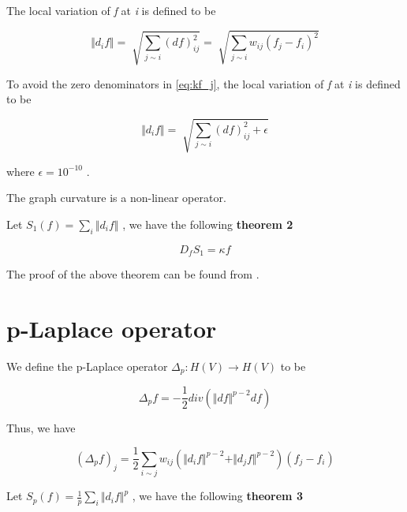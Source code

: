 The local variation of \textit{f} at \textit{i} is defined to be 


\begin{equation}
\Vert d_{i}f \Vert =\sqrt[]{ \sum _{j \sim i}^{} \left( df \right) _{ij}^{2}}=\sqrt[]{ \sum _{j \sim i}^{}w_{ij} \left( f_{j}-f_{i} \right) ^{2}}
\end{equation}


To avoid the zero denominators in \ref{eq:kf_j}, the local variation of \textit{f} at \textit{i} is defined to be


\begin{equation}
\Vert d_{i}f \Vert =\sqrt[]{ \sum _{j \sim i}^{} \left( df \right) _{ij}^{2}+ \epsilon }
\end{equation}


where  \(  \epsilon =10^{-10} \) .

The graph curvature is a non-linear operator.    

Let  \( S_{1} \left( f \right) = \sum _{i}^{} \Vert d_{i}f \Vert  \) , we have the following \textbf{theorem 2}


\begin{equation}
D_{f}S_{1}= \kappa f
\end{equation}


The proof of the above theorem can be found from \citep{tran2015normalized, tran2017normalized}.


\section{p-Laplace operator}

We define the p-Laplace operator  \(  \Delta _{p}:H \left( V \right)  \rightarrow H \left( V \right)  \)  to be 


\begin{equation}
\Delta _{p}f=-\frac{1}{2}div \left(  \Vert df \Vert ^{p-2}df \right)
\end{equation}


Thus, we have


\begin{equation}
\left(  \Delta _{p}f \right) _{j}=\frac{1}{2} \sum _{i \sim j}^{}w_{ij} \left(  \Vert d_{i}f \Vert ^{p-2}+ \Vert d_{j}f \Vert ^{p-2} \right)  \left( f_{j}-f_{i} \right)
\end{equation}

Let  \( S_{p} \left( f \right) =\frac{1}{p} \sum _{i}^{} \Vert d_{i}f \Vert ^{p} \) , we have the following \textbf{theorem 3}\ \ \ \  \par


